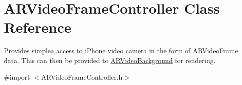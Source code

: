 \hypertarget{interface_a_r_video_frame_controller}{
\section{\-A\-R\-Video\-Frame\-Controller \-Class \-Reference}
\label{interface_a_r_video_frame_controller}
}


\-Provides simplea access to i\-Phone video camera in the form of \hyperlink{struct_a_r_video_frame}{\-A\-R\-Video\-Frame} data. \-This can then be provided to \hyperlink{interface_a_r_video_background}{\-A\-R\-Video\-Background} for rendering.  




{\ttfamily \#import $<$\-A\-R\-Video\-Frame\-Controller.\-h$>$}

